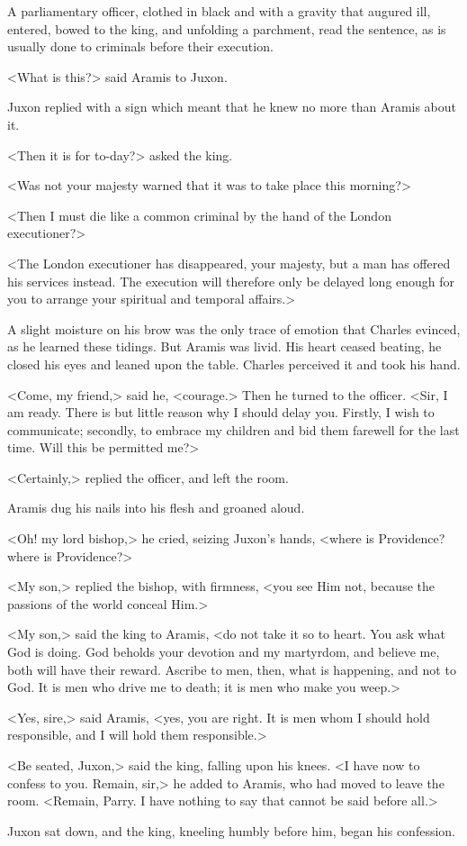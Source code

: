 A parliamentary officer, clothed in black and with a gravity that augured ill, entered, bowed to the king, and unfolding a parchment, read the sentence, as is usually done to criminals before their execution.

<What is this?> said Aramis to Juxon.

Juxon replied with a sign which meant that he knew no more than Aramis about it.

<Then it is for to-day?> asked the king.

<Was not your majesty warned that it was to take place this morning?>

<Then I must die like a common criminal by the hand of the London executioner?>

<The London executioner has disappeared, your majesty, but a man has offered his services instead. The execution will therefore only be delayed long enough for you to arrange your spiritual and temporal affairs.>

A slight moisture on his brow was the only trace of emotion that Charles evinced, as he learned these tidings. But Aramis was livid. His heart ceased beating, he closed his eyes and leaned upon the table. Charles perceived it and took his hand.

<Come, my friend,> said he, <courage.> Then he turned to the officer. <Sir, I am ready. There is but little reason why I should delay you. Firstly, I wish to communicate; secondly, to embrace my children and bid them farewell for the last time. Will this be permitted me?>

<Certainly,> replied the officer, and left the room.

Aramis dug his nails into his flesh and groaned aloud.

<Oh! my lord bishop,> he cried, seizing Juxon's hands, <where is Providence? where is Providence?>

<My son,> replied the bishop, with firmness, <you see Him not, because the passions of the world conceal Him.>

<My son,> said the king to Aramis, <do not take it so to heart. You ask what God is doing. God beholds your devotion and my martyrdom, and believe me, both will have their reward. Ascribe to men, then, what is happening, and not to God. It is men who drive me to death; it is men who make you weep.>

<Yes, sire,> said Aramis, <yes, you are right. It is men whom I should hold responsible, and I will hold them responsible.>

<Be seated, Juxon,> said the king, falling upon his knees. <I have now to confess to you. Remain, sir,> he added to Aramis, who had moved to leave the room. <Remain, Parry. I have nothing to say that cannot be said before all.>

Juxon sat down, and the king, kneeling humbly before him, began his confession. 